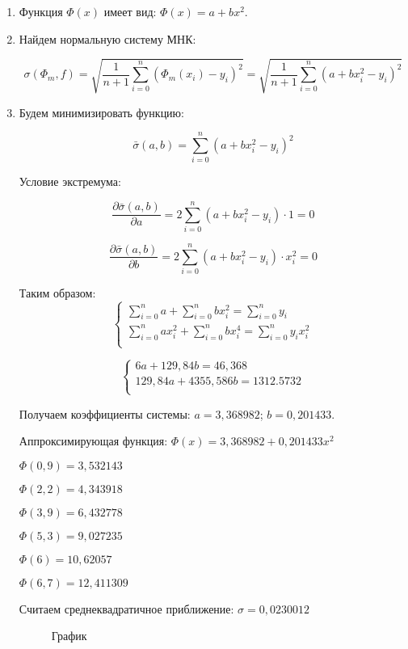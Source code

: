 \documentclass[a4paper,12pt]{article} %
\begin{document}
\begin{enumerate}

\item Функция $\Phi(x)$ имеет вид: $\Phi(x) = a + bx^2$.

\item Найдем нормальную систему МНК:

$$\sigma(\Phi_m, f) = \sqrt{\frac{1}{n + 1}\sum_{i = 0}^{n}(\Phi_m(x_i) - y_i)^2} = \sqrt{\frac{1}{n + 1}\sum_{i = 0}^{n}(a + bx_i^2 - y_i)^2}$$

\item Будем минимизировать функцию:

$$\bar \sigma(a, b) = \sum_{i = 0}^n(a + bx_i^2 - y_i)^2$$

Условие экстремума:

$$\frac{\partial \bar \sigma(a, b)}{\partial a} = 2\sum_{i = 0}^n(a + bx_i^2 - y_i) \cdot 1 = 0$$

$$\frac{\partial \bar \sigma(a, b)}{\partial b} = 2\sum_{i = 0}^n(a + bx_i^2 - y_i) \cdot x_i^2 = 0$$

Таким образом:
$$
\begin{cases}
    \sum_{i = 0}^n a + \sum_{i = 0}^n bx_i^2 = \sum_{i = 0}^n y_i \\
    \sum_{i = 0}^n ax_i^2 + \sum_{i = 0}^n bx_i^4 = \sum_{i = 0}^n y_i x_i^2 \\
\end{cases}
$$

$$
\begin{cases}
    6a + 129,84b = 46,368 \\
    129,84a + 4355,586b = 1312.5732 \\
\end{cases}
$$

Получаем коэффициенты системы: $a = 3,368982$; $b = 0,201433$.

Аппроксимирующая функция: $\Phi(x) = 3,368982 + 0,201433x^2$

\begin{center}
    $\Phi(0,9) = 3,532143$
    
    $\Phi(2,2) = 4,343918$
    
    $\Phi(3,9) = 6,432778$
    
    $\Phi(5,3) = 9,027235$
    
    $\Phi(6) = 10,62057$
    
    $\Phi(6,7) = 12,411309$
\end{center}

Считаем среднеквадратичное приближение: $\sigma = 0,0230012$



\begin{figure}[h]
\caption{График}
\label{fig:image}
\end{figure}


\end{enumerate}
\end{document}
